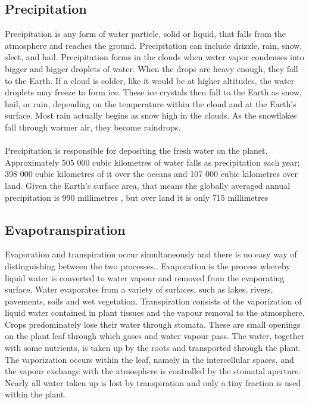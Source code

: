 \subsection{Precipitation}
Precipitation is any form of water particle, solid or liquid, that falls from the atmosphere and reaches the ground. Precipitation can include drizzle, rain, snow, sleet, and hail. Precipitation forms in the clouds when water vapor condenses into bigger and bigger droplets of water. When the drops are heavy enough, they fall to the Earth. If a cloud is colder, like it would be at higher altitudes, the water droplets may freeze to form ice. These ice crystals then fall to the Earth as snow, hail, or rain, depending on the temperature within the cloud and at the Earth's surface. Most rain actually begins as snow high in the clouds. As the snowflakes fall through warmer air, they become raindrops. \\\\
Precipitation is responsible for depositing the fresh water on the planet. Approximately 505 000 cubic kilometres of water falls as precipitation each year; 398 000 cubic kilometres of it over the oceans and 107 000 cubic kilometres over land.\cite{ghassemi1995salinization} Given the Earth's surface area, that means the globally averaged annual precipitation is 990 millimetres , but over land it is only 715 millimetres
\subsection{Evapotranspiration}
Evaporation and transpiration occur simultaneously and there is no easy way of distinguishing between the two processes.\cite{allen1998crop}.
Evaporation is the process whereby liquid water is converted to water vapour and removed from the evaporating surface. Water evaporates from a variety of surfaces, such as lakes, rivers, pavements, soils and wet vegetation.
Transpiration consists of the vaporization of liquid water contained in plant tissues and the vapour removal to the atmosphere. Crops predominately lose their water through stomata. These are small openings on the plant leaf through which gases and water vapour pass. The water, together with some nutrients, is taken up by the roots and transported through the plant. The vaporization occurs within the leaf, namely in the intercellular spaces, and the vapour exchange with the atmosphere is controlled by the stomatal aperture. Nearly all water taken up is lost by transpiration and only a tiny fraction is used within the plant.\cite{oguntunde2004evapotranspiration}
